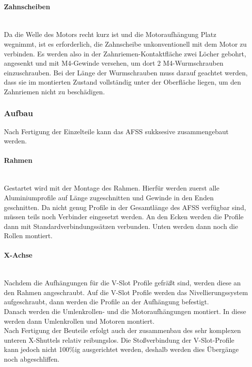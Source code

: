 \paragraph{Zahnscheiben}\mbox{}\\
Da die Welle des Motors recht kurz ist und die Motoraufhängung Platz wegnimmt, ist es erforderlich, die Zahnscheibe unkonventionell mit dem Motor zu verbinden. Es werden also in der Zahnriemen-Kontaktfläche zwei Löcher gebohrt, angesenkt und mit M4-Gewinde versehen, um dort 2 M4-Wurmschrauben einzuschrauben. Bei der Länge der Wurmschrauben muss darauf geachtet werden, dass sie im montierten Zustand vollständig unter der Oberfläche liegen, um den Zahnriemen nicht zu beschädigen.

\subsubsection{Aufbau}

Nach Fertigung der Einzelteile kann das AFSS sukksesive zusammengebaut werden.

\paragraph{Rahmen} \mbox{}\\
Gestartet wird mit der Montage des Rahmen. Hierfür werden zuerst alle Aluminiumprofile auf Länge zugeschnitten und Gewinde in den Enden geschnitten. Da nicht genug Profile in der Gesamtlänge des AFSS verfügbar sind, müssen teils noch Verbinder eingesetzt werden. An den Ecken werden die Profile dann mit Standardverbindungssätzen verbunden. Unten werden dann noch die Rollen montiert.

\paragraph{X-Achse} \mbox{}\\
Nachdem die Aufhängungen für die V-Slot Profile gefräßt sind, werden diese an den Rahmen angeschraubt. Auf die V-Slot Profile werden das Nivellierungssystem aufgeschraubt, dann werden die Profile an der Aufhängung befestigt. \\
Danach werden die Umlenkrollen- und die Motoraufhängungen montiert. In diese werden dann Umlenkrollen und Motoren montiert. \\
Nach Fertigung der Beuteile erfolgt auch der zusammenbau des sehr komplexen unteren X-Shuttels relativ reibungslos. Die Stoßverbindung der V-Slot-Profile kann jedoch nicht 100\%ig ausgerichtet werden, deshalb werden dies Übergänge noch abgeschliffen.


